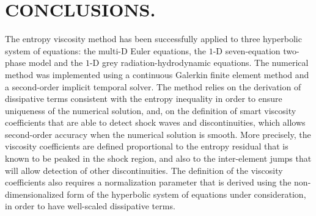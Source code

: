 %
%
%


\chapter{\uppercase {Conclusions.}}\label{chap:conclusion}

The entropy viscosity method has been successfully applied to three hyperbolic system of equations: the multi-D Euler equations, the $1$-D seven-equation two-phase model and the $1$-D grey radiation-hydrodynamic equations. The numerical method was implemented using a continuous Galerkin finite element method and a second-order implicit temporal solver. The method relies on the derivation of dissipative terms consistent with the entropy inequality in order to ensure uniqueness of the numerical solution, and, on the definition of smart viscosity coefficients that are able to detect shock waves and discontinuities, which allows second-order accuracy when the numerical solution is smooth. More precisely, the viscosity coefficients are defined proportional to the entropy residual that is known to be peaked in the shock region, and also to the inter-element jumps that will allow detection of other discontinuities. The definition of the viscosity coefficients also requires a normalization parameter that is derived using the non-dimensionalized form of the hyperbolic system of equations under consideration, in order to have well-scaled dissipative terms.

